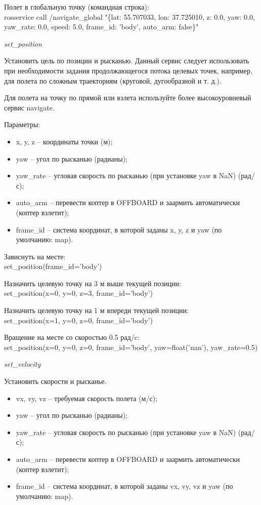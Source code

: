 Полет в глобальную точку (командная строка):\\
rosservice call /navigate\_global "\{lat: 55.707033, lon: 37.725010, z: 0.0, yaw: 0.0, yaw\_rate: 0.0, speed: 5.0, frame\_id: 'body', auto\_arm: false\}"\

\textit{set\_position}

Установить цель по позиции и рысканью. Данный сервис следует использовать при необходимости задания продолжающегося потока целевых точек, например, для полета по сложным траекториям (круговой, дугообразной и т. д.).

Для полета на точку по прямой или взлета используйте более высокоуровневый сервис navigate.

Параметры:
\begin{itemize}
    \item x, y, z – координаты точки (м);
    \item yaw – угол по рысканью (радианы);
    \item yaw\_rate – угловая скорость по рысканью (при установке yaw в NaN) (рад/с);
    \item auto\_arm – перевести коптер в OFFBOARD и заармить автоматически (коптер взлетит);
    \item frame\_id – система координат, в которой заданы x, y, z и yaw (по умолчанию: map).
\end{itemize}

Зависнуть на месте:\\
set\_position(frame\_id='body')

Назначить целевую точку на 3 м выше текущей позиции:\\
set\_position(x=0, y=0, z=3, frame\_id='body')

Назначить целевую точку на 1 м впереди текущей позиции:\\
set\_position(x=1, y=0, z=0, frame\_id='body')

Вращение на месте со скоростью 0.5 рад/c:\\
set\_position(x=0, y=0, z=0, frame\_id='body', yaw=float('nan'), yaw\_rate=0.5)

\textit{set\_velocity}

Установить скорости и рысканье.
\begin{itemize}
    \item vx, vy, vz – требуемая скорость полета (м/с);
    \item yaw – угол по рысканью (радианы);
    \item yaw\_rate – угловая скорость по рысканью (при установке yaw в NaN) (рад/с);
    \item auto\_arm – перевести коптер в OFFBOARD и заармить автоматически (коптер взлетит);
    \item frame\_id – система координат, в которой заданы vx, vy, vz и yaw (по умолчанию: map).
\end{itemize}

